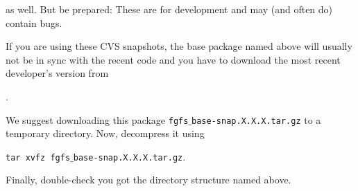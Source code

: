  \noindent
 as well. But be prepared: These are for development and may (and often do)
contain bugs.

If you are using these CVS snapshots, the base package named above will usually not be
in sync with the recent code and you have to download the most recent developer's version
from
 \medskip

 .
 \medskip

\noindent
We suggest downloading this package \texttt{fgfs$\_$base-snap.X.X.X.tar.gz} to a temporary
directory. Now, decompress it using
\medskip

 \texttt{tar xvfz fgfs$\_$base-snap.X.X.X.tar.gz}.
 \medskip
 
Finally, double-check you got the directory structure named above.

